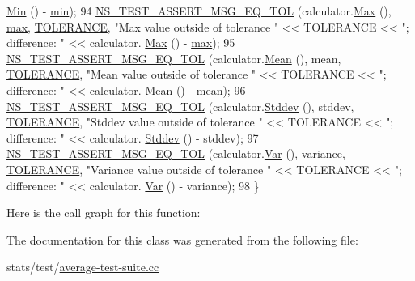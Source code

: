 \begin{DoxyCode}
      \hyperlink{classns3_1_1Average_a4649e7990b939fc55360312ac4ab6828}{Min} () - \hyperlink{80211b_8c_ac6afabdc09a49a433ee19d8a9486056d}{min});
94   \hyperlink{group__testing_ga9e7861b56b4e70db3b56044cb7a28e41}{NS\_TEST\_ASSERT\_MSG\_EQ\_TOL} (calculator.\hyperlink{classns3_1_1Average_a259a45edf08a70e46c79c627944ff9af}{Max} (), \hyperlink{80211b_8c_affe776513b24d84b39af8ab0930fef7f}{max}, 
      \hyperlink{average-test-suite_8cc_a89311a98397f9d6967d2cb10d5152d77}{TOLERANCE}, \textcolor{stringliteral}{"Max value outside of tolerance "} << TOLERANCE << \textcolor{stringliteral}{"; difference: "} << calculator.
      \hyperlink{classns3_1_1Average_a259a45edf08a70e46c79c627944ff9af}{Max} () - \hyperlink{80211b_8c_affe776513b24d84b39af8ab0930fef7f}{max});
95   \hyperlink{group__testing_ga9e7861b56b4e70db3b56044cb7a28e41}{NS\_TEST\_ASSERT\_MSG\_EQ\_TOL} (calculator.\hyperlink{classns3_1_1Average_a750277f678abfdc0184d697238975b93}{Mean} (), mean, 
      \hyperlink{average-test-suite_8cc_a89311a98397f9d6967d2cb10d5152d77}{TOLERANCE}, \textcolor{stringliteral}{"Mean value outside of tolerance "} << TOLERANCE << \textcolor{stringliteral}{"; difference: "} << calculator.
      \hyperlink{classns3_1_1Average_a750277f678abfdc0184d697238975b93}{Mean} () - mean);
96   \hyperlink{group__testing_ga9e7861b56b4e70db3b56044cb7a28e41}{NS\_TEST\_ASSERT\_MSG\_EQ\_TOL} (calculator.\hyperlink{classns3_1_1Average_ac7536c397973130662606c1019049503}{Stddev} (), stddev, 
      \hyperlink{average-test-suite_8cc_a89311a98397f9d6967d2cb10d5152d77}{TOLERANCE}, \textcolor{stringliteral}{"Stddev value outside of tolerance "} << TOLERANCE << \textcolor{stringliteral}{"; difference: "} << calculator.
      \hyperlink{classns3_1_1Average_ac7536c397973130662606c1019049503}{Stddev} () - stddev);
97   \hyperlink{group__testing_ga9e7861b56b4e70db3b56044cb7a28e41}{NS\_TEST\_ASSERT\_MSG\_EQ\_TOL} (calculator.\hyperlink{classns3_1_1Average_af81b1dec6bcafabf4ed63f43fdd8f568}{Var} (), variance, 
      \hyperlink{average-test-suite_8cc_a89311a98397f9d6967d2cb10d5152d77}{TOLERANCE}, \textcolor{stringliteral}{"Variance value outside of tolerance "} << TOLERANCE << \textcolor{stringliteral}{"; difference: "} << calculator.
      \hyperlink{classns3_1_1Average_af81b1dec6bcafabf4ed63f43fdd8f568}{Var} () - variance);
98 \}
\end{DoxyCode}


Here is the call graph for this function\+:




The documentation for this class was generated from the following file\+:\begin{DoxyCompactItemize}
\item 
stats/test/\hyperlink{average-test-suite_8cc}{average-\/test-\/suite.\+cc}\end{DoxyCompactItemize}
